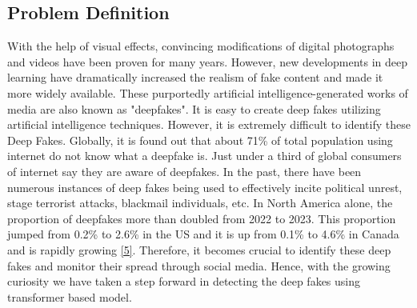 \subsection{Problem Definition}
With the help of visual effects, convincing modifications of digital photographs and videos have been proven for many years. However, new developments in deep learning have dramatically increased the realism of fake content and made it more widely available. These purportedly artificial intelligence-generated works of media are also known as "deepfakes". It is easy to create deep fakes utilizing artificial intelligence techniques. However, it is extremely difficult to identify these Deep Fakes.
Globally, it is found out that about 71\% of total population using internet do not know what a deepfake is. Just under a third of global consumers of internet say they are aware of deepfakes. In the past, there have been numerous instances of deep fakes being used to effectively incite political unrest, stage terrorist attacks, blackmail individuals, etc.
In North America alone, the proportion of deepfakes more than doubled from 2022 to 2023. This proportion jumped from 0.2\% to 2.6\% in the US and it is up from 0.1\% to 4.6\% in Canada and is rapidly growing \hyperref[ref5]{[5]}. Therefore, it becomes crucial to identify these deep fakes and monitor their spread through social media. Hence, with the growing curiosity we have taken a step forward in detecting the deep fakes using transformer based model.